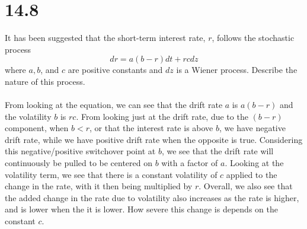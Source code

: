 \documentclass{article}
\begin{document}
{\Large 

\section*{14.8}
It has been suggested that the short-term interest rate, \(r\), follows the stochastic process
\[
  dr = a(b - r)dt + rc dz
\]
where \(a, b\), and \(c\) are positive constants and \(dz\) is a Wiener process. Describe the nature of this process. \\ \\
From looking at the equation, we can see that the drift rate \(a\) is \(a(b-r)\) and the volatility \(b\) is \(rc\). From looking just at the drift rate, due to the \((b-r)\) component, when \(b < r\), or that the interest rate is above \(b\), we have negative drift rate, while we have positive drift rate when the opposite is true. Considering this negative/positive switchover point at \(b\), we see that the drift rate will continuously be pulled to be centered on \(b\) with a factor of \(a\). Looking at the volatility term, we see that there is a constant volatility of \(c\) applied to the change in the rate, with it then being multiplied by \(r\). Overall, we also see that the added change  in the rate due to volatility also increases as the rate is higher, and is lower when the it is lower. How severe this change is depends on the constant \(c\).

}
\end{document}
